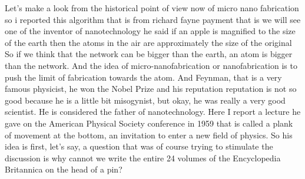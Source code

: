 Let's make a look from the historical point of view now of micro nano fabrication so i reported this algorithm that is from richard fayne payment that is we will see one of the inventor of nanotechnology he said if an apple is magnified to the size of the earth then the atoms in the air are approximately the size of the original So if we think that the network can be bigger than the earth, an atom is bigger than the network. And the idea of micro-nanofabrication or nanofabrication is to push the limit of fabrication towards the atom. And Feynman, that is a very famous physicist, he won the Nobel Prize and his reputation reputation is not so good because he is a little bit misogynist, but okay, he was really a very good scientist. He is considered the father of nanotechnology. Here I report a lecture he gave on the American Physical Society conference in 1959 that is called a plank of movement at the bottom, an invitation to enter a new field of physics. So his idea is first, let's say, a question that was of course trying to stimulate the discussion is why cannot we write the entire 24 volumes of the Encyclopedia Britannica on the head of a pin?
